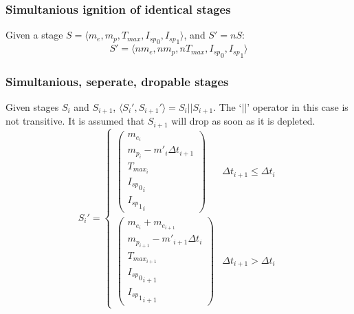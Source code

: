 \subsubsection{Simultanious ignition of identical stages}
Given a stage $S = \langle m_e, m_p, T_{max}, {I_{sp}}_0, {I_{sp}}_1 \rangle$, and $S' = nS$:
\begin{equation}
    S' = \langle nm_{e}, nm_{p}, nT_{max}, {I_{sp}}_0, {I_{sp}}_1 \rangle
\end{equation}
\subsubsection{Simultanious, seperate, dropable stages}
Given stages $S_{i}$ and $S_{i+1}$, $\langle S_{i}', S_{i+1}' \rangle = S_{i} || S_{i+1}$.
The `$||$' operator in this case is not transitive.
It is assumed that $S_{i+1}$ will drop as soon as it is depleted.
\begin{equation}
    S_{i}' =
        \begin{cases}
            \begin{pmatrix}
                m_{e_{i}} \\
                m_{p_{i}} - {m'}_{i}{\Delta{}t}_{i+1} \\
                T_{max_{i}} \\
                {{I_{sp}}_{0}}_i \\
                {{I_{sp}}_{1}}_i
            \end{pmatrix} &
            {\Delta{}t}_{i+1} \leq {\Delta{}t}_{i} \\
            \begin{pmatrix}
                m_{e_{i}} + m_{e_{i+1}} \\
                m_{p_{i+1}} - {m'}_{i+1}{\Delta{}t}_{i} \\
                T_{max_{i+1}} \\
                {{I_{sp}}_{0}}_{i+1} \\
                {{I_{sp}}_{1}}_{i+1}
            \end{pmatrix} &
            {\Delta{}t}_{i+1} > {\Delta{}t}_{i}
        \end{cases}
\end{equation}
